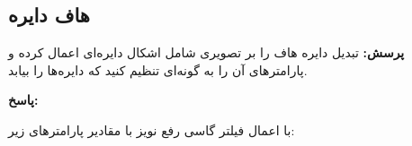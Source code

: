 \documentclass[12pt,a4paper]{article}
\theoremstyle{definition}
\theoremstyle{theorem}
\theoremstyle{definition}
\begin{document}
\vspace{0.2cm}
\begin{center}
\end{center}

\vspace{0.5cm}
\subsection{هاف دایره}

\textbf{پرسش: }
 تبدیل دایره هاف را بر تصویری شامل اشکال دایره‌ای اعمال کرده و پارامترهای آن را به گونه‌ای تنظیم کنید که دایره‌ها را بیابد.
 
\textbf{پاسخ: }

با اعمال فیلتر گاسی رفع نویز با مقادیر پارامترهای زیر: 

\end{document}
